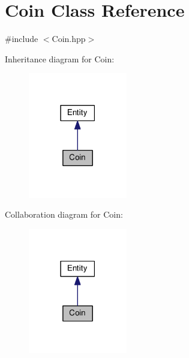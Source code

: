 \hypertarget{classCoin}{}\section{Coin Class Reference}
\label{classCoin}


{\ttfamily \#include $<$Coin.\+hpp$>$}



Inheritance diagram for Coin\+:\nopagebreak
\begin{figure}[H]
\begin{center}
\leavevmode
\includegraphics[width=122pt]{classCoin__inherit__graph}
\end{center}
\end{figure}


Collaboration diagram for Coin\+:\nopagebreak
\begin{figure}[H]
\begin{center}
\leavevmode
\includegraphics[width=122pt]{classCoin__coll__graph}
\end{center}
\end{figure}
